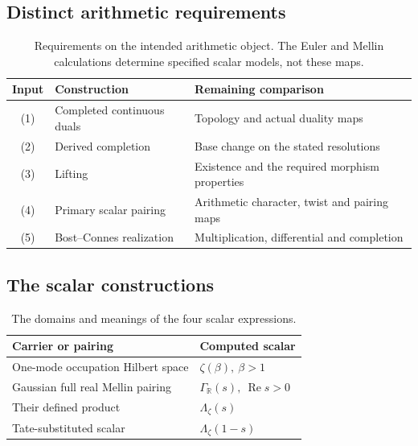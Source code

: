 \subsection{Distinct arithmetic requirements}
\label{v4-arith:prim-zeta:remaining-four}
\label{v4-arith:prim-zeta:residual-table}
\begin{table}[h]
\centering\small
\begin{tabular}{c|p{5.8cm}|p{4.2cm}}
Input & Construction & Remaining comparison\\\hline
(1)& Completed continuous duals & Topology and actual duality maps\\
(2)& Derived completion & Base change on the stated resolutions\\
(3)& Lifting & Existence and the required morphism properties\\
(4)& Primary scalar pairing & Arithmetic character, twist and pairing maps\\
(5)& Bost--Connes realization & Multiplication, differential and completion\\
\end{tabular}
\caption{Requirements on the intended arithmetic object. The Euler and
Mellin calculations determine specified scalar models, not these maps.}
\label{v4-arith:prim-zeta:tab:residual}
\end{table}

\subsection{The scalar constructions}
\label{v4-arith:prim-zeta:table-summary}
\begin{table}[h]
\centering\small
\begin{tabular}{l|l}
Carrier or pairing & Computed scalar\\\hline
One-mode occupation Hilbert space & \(\zeta(\beta),\ \beta>1\)\\
Gaussian full real Mellin pairing & \(\Gamma_{\mathbb R}(s),\ \operatorname{Re}s>0\)\\
Their defined product & \(\Lambda_\zeta(s)\)\\
Tate-substituted scalar & \(\Lambda_\zeta(1-s)\)\\
\end{tabular}
\caption{The domains and meanings of the four scalar expressions.}
\label{v4-arith:prim-zeta:tab:table}
\end{table}

